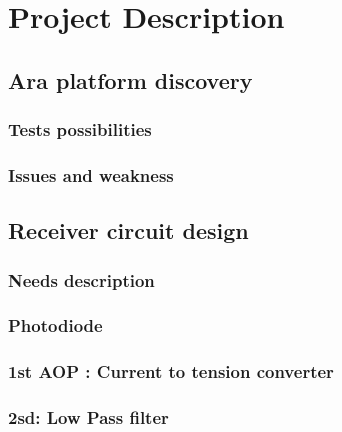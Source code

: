 
\chapter{Project Description}

\label{ProjectD}



\section{Ara platform discovery}

\subsection{Tests possibilities}

\subsection{Issues and weakness}



\section{Receiver circuit design}

\subsection{Needs description}
\subsection{Photodiode}
\subsection{1st AOP : Current to tension converter}
\subsection{2sd: Low Pass filter}
